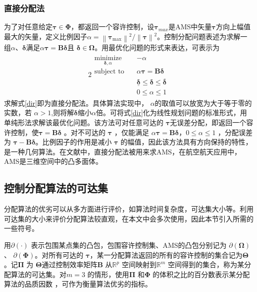 \subsubsection{直接分配法}
%
为了对任意给定$\bm{\tau} \in \bm{\Phi}$，都返回一个容许控制，设$\bm{\tau}_{max} $是AMS中矢量$\bm{\tau} $方向上幅值最大的矢量，定义比例因子$\alpha=\left\|\bm{\tau}_{\max }\right\|^{2} /\left\|\bm{\tau}\right\|^{2}$。控制分配问题表述为求解一组$\alpha$、$ \bm{\delta} $满足$\alpha\bm{\tau}=\bm{B}\bm{\delta}$且 $\bm{\delta } \in \bm{\Omega}  $。用最优化问题的形式来表达，可表示为\cite{Bodson_2002}
\begin{alignat}{2}
\begin{split}
\mathop {{\text{minimize}}}\limits_{\bm{\delta},\alpha}\quad&{-\alpha} \\
\mbox{subject to}\quad
&\alpha\bm{\tau}=\bm{B}\bm{\delta} \\
&\underline{\bm{\delta}} \leq \bm{\delta} \leq \overline{\bm{\delta}} \\
&0 \leq \alpha \leq 1
\end{split} \label{dir}
\end{alignat}
求解式\eqref{dir}即为直接分配法。具体算法实现中， $ \alpha $的取值可以放宽为大于等于零的实数，若 $ \alpha >1 $,则将解$ \bm{\delta} $缩小$ \alpha $倍。可将式\eqref{dir}化为线性规划问题的标准形式，用单纯形法求解该最优化问题\cite{Bodson_2002}。该方法可对任意可达的 $ \bm{\tau} $无误差分配，即返回一个容许控制，使$ \bm{\tau}=\bm{B}\bm{\delta} $ 。对不可达的 $ \bm{\tau} $ ，仅能满足 $ \alpha\bm{\tau}=\bm{B}\bm{\delta} $，$ 0 \leq \alpha \leq 1 $ ，分配误差为 $ \bm{\tau}-\bm{B}\bm{\delta} $。比例因子的作用是减小 $ \bm{\tau} $ 的幅值，因此该方法具有方向保持的特性，是一种几何算法。在文献\parencite{Durham_2017}中，直接分配法被用来求AMS，在航空航天应用中，AMS是三维空间中的凸多面体。
\subsection{控制分配算法的可达集}
分配算法的优劣可以从多方面进行评价，如算法时间复杂度\cite{Harkegard_2002}，可达集大小\cite{Durham_2017}等。利用可达集的大小来评价分配算法较直观，在本文中会多次使用，因此本节引入所需的一些符号。

用$\partial(\cdot)$ 表示包围某点集的凸包，包围容许控制集、AMS的凸包分别记为 $\partial(\bm{\Omega})$、 $\partial(\bm{\Phi})$。对所有可达的  $ \bm{\tau} $，某一分配算法返回的所有的容许控制的集合记为$\bm{\Theta} $ 。记$\bm{\Pi} $ 为 $\bm{\Theta} $通过控制效率矩阵$ \bm{B} $ 从$ {{\mathbb{R}}^p} $ 空间映射到$ {{\mathbb{R}}^m} $ 空间得到的集合，称为某分配算法的可达集。对$ m=3 $ 的情形，使用$\bm{\Pi} $ 和$ \bm{\Phi} $ 的体积之比的百分数表示某分配算法的品质因数 ，可作为衡量算法优劣的指标\cite{Durham_2017}。



